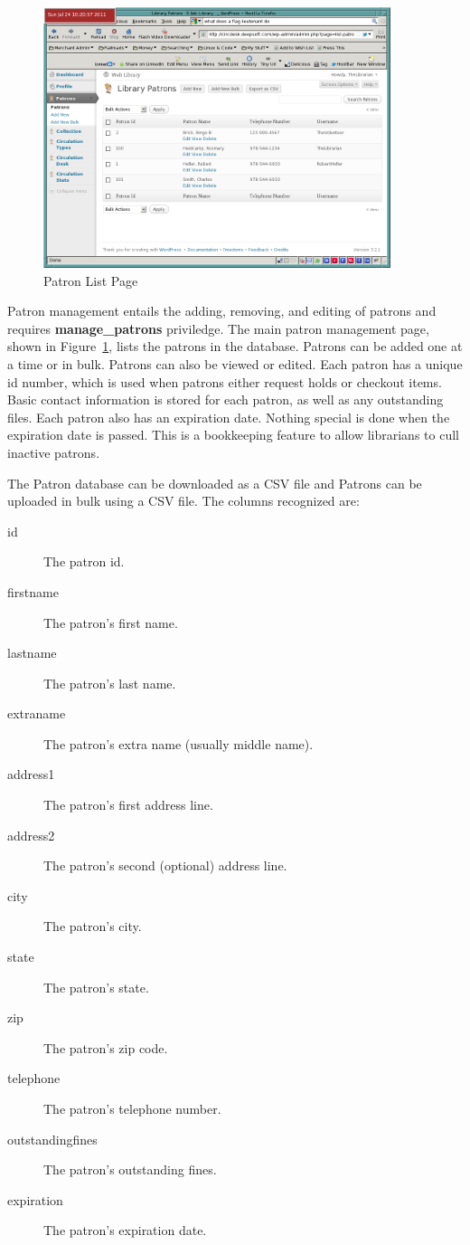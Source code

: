 \documentclass[letterpaper,twoside]{article}
\begin{document}
\begin{figure}[htbp]
\begin{centering}
\includegraphics[width=4in]{PatronManagement.png}
\caption{Patron List Page}
\label{fig:PatronList}
\end{centering}
\end{figure}
Patron management entails the adding, removing, and editing of patrons
and requires \textbf{manage\_patrons} priviledge.  The main patron
management page, shown in Figure~\ref{fig:PatronList}, lists the
patrons in the database. Patrons can be added one at a time or in bulk.
Patrons can also be viewed or edited.  Each patron has a unique id
number, which is used when patrons either request holds or checkout
items.  Basic contact information is stored for each patron, as well as
any outstanding files.  Each patron also has an expiration date.
Nothing special is done when the expiration date is passed.  This is a
bookkeeping feature to allow librarians to cull inactive patrons.

The Patron database can be downloaded as a CSV file and Patrons can be
uploaded in bulk using a CSV file.  The columns recognized are:
\begin{description}
\item[id] The patron id.
\item[firstname] The patron's first name.
\item[lastname] The patron's last name.
\item[extraname] The patron's extra name (usually middle name).
\item[address1] The patron's first address line.
\item[address2] The patron's second (optional) address line.
\item[city] The patron's city.
\item[state] The patron's state.
\item[zip] The patron's zip code.
\item[telephone] The patron's telephone number.
\item[outstandingfines] The patron's outstanding fines.
\item[expiration] The patron's expiration date.
\end{description}
\end{document}
